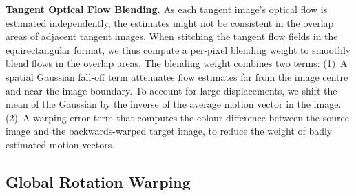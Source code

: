 \textbf{Tangent Optical Flow Blending.}
%
As each tangent image's optical flow is estimated independently, the estimates might not be consistent in the overlap areas of adjacent tangent images.
%
When stitching the tangent flow fields in the equirectangular format, we thus compute a per-pixel blending weight to smoothly blend flows in the overlap areas.
%
The blending weight combines two terms:
%
(1)~A spatial Gaussian fall-off term attenuates flow estimates far from the image centre and near the image boundary.
To account for large displacements, we shift the mean of the Gaussian by the inverse of the average motion vector in the image.
%
(2)~A warping error term that computes the colour difference between the source image and the backwards-warped target image, to reduce the weight of badly estimated motion vectors.





\subsection{Global Rotation Warping}
\label{sec:approach:warping}

